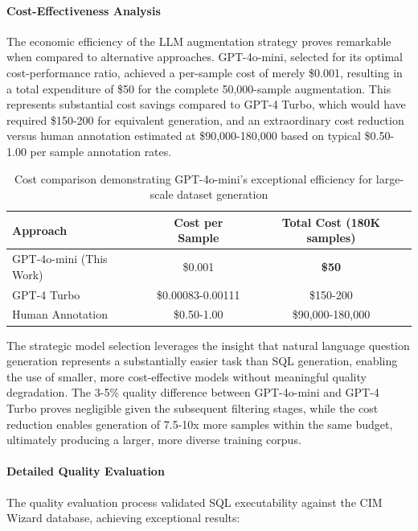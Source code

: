 \paragraph{Cost-Effectiveness Analysis}

The economic efficiency of the LLM augmentation strategy proves remarkable when compared to alternative approaches. GPT-4o-mini, selected for its optimal cost-performance ratio, achieved a per-sample cost of merely \$0.001, resulting in a total expenditure of \$50 for the complete 50,000-sample augmentation. This represents substantial cost savings compared to GPT-4 Turbo, which would have required \$150-200 for equivalent generation, and an extraordinary cost reduction versus human annotation estimated at \$90,000-180,000 based on typical \$0.50-1.00 per sample annotation rates.

\begin{table}%
\centering
\begin{tabular}{lcc}
\toprule
\textbf{Approach} & \textbf{Cost per Sample} & \textbf{Total Cost (180K samples)} \\
\midrule
GPT-4o-mini (This Work) & \$0.001 & \textbf{\$50} \\
GPT-4 Turbo & \$0.00083-0.00111 & \$150-200 \\
Human Annotation & \$0.50-1.00 & \$90,000-180,000 \\
\bottomrule
\end{tabular}
\caption{Cost comparison demonstrating GPT-4o-mini's exceptional efficiency for large-scale dataset generation}
\end{table}

The strategic model selection leverages the insight that natural language question generation represents a substantially easier task than SQL generation, enabling the use of smaller, more cost-effective models without meaningful quality degradation. The 3-5\% quality difference between GPT-4o-mini and GPT-4 Turbo proves negligible given the subsequent filtering stages, while the cost reduction enables generation of 7.5-10x more samples within the same budget, ultimately producing a larger, more diverse training corpus.

\paragraph{Detailed Quality Evaluation}

The quality evaluation process validated SQL executability against the CIM Wizard database, achieving exceptional results:

